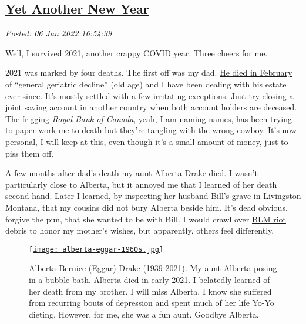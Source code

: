 %

\subsection*{\href{http://analyzethedatanotthedrivel.org/2022/01/06/yet-another-new-year/}{Yet Another New Year}}


\noindent\emph{Posted: 06 Jan 2022 16:54:39}
\vspace{6pt}

Well, I survived 2021, another crappy COVID year. Three cheers for me.

2021 was marked by four deaths. The first off was my dad.
\href{https://analyzethedatanotthedrivel.org/2021/02/21/my-fathers-obituary/}{He
died in February} of ``general geriatric decline'' (old age) and I have
been dealing with his estate ever since. It's mostly settled with a few
irritating exceptions. Just try closing a joint saving account in
another country when both account holders are deceased. The frigging
\emph{Royal Bank of Canada}, yeah, I am naming names, has been trying to
paper-work me to death but they're tangling with the wrong cowboy. It's
now personal, I will keep at this, even though it's a small amount of
money, just to piss them off.~

A few months after dad's death my aunt Alberta Drake died. I wasn't
particularly close to Alberta, but it annoyed me that I learned of her
death second-hand. Later I learned, by inspecting her husband Bill's
grave in Livingston Montana, that my cousins did not bury Alberta beside
him. It's dead obvious, forgive the pun, that she wanted to be with
Bill. I would crawl over
\href{https://townhall.com/tipsheet/katiepavlich/2020/09/08/new-study-shows-majority-of-blm-protests-turned-violent-n2575801}{BLM
riot} debris to honor my mother's wishes, but apparently, others feel
differently.

\captionsetup[figure]{labelformat=empty}
\begin{SCfigure}[50]
\centering
\href{https://conceptcontrol.smugmug.com/People/From-Hazels-Albums-1/i-zNgjGnk/A}{\texttt{[image: alberta-eggar-1960s.jpg]}}
\caption[Alberta Bernice (Eggar) Drake (1939-2021)]{Alberta Bernice (Eggar) Drake (1939-2021). My aunt Alberta
posing in a bubble bath. Alberta died in early 2021. I belatedly learned
of her death from my brother. I will miss Alberta. I know she suffered
from recurring bouts of depression and spent much of her life Yo-Yo
dieting. However, for me, she was a fun aunt. Goodbye Alberta.}
\label{fig:7274x0}
\end{SCfigure}

